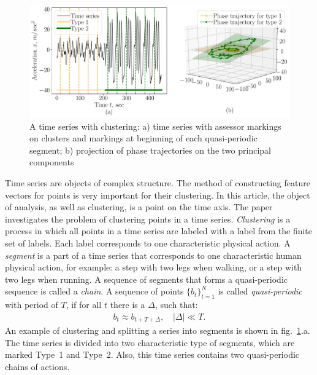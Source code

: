 \documentclass[12pt, twoside]{article}
\numberwithin{equation}{section}
\begin{document}
\begin{figure}[h!t]\center
\includegraphics[width=1\textwidth]{results_eng/introduction}
\caption{A time series with clustering:  a) time series with assessor markings on clusters and markings at beginning of each quasi-periodic segment; b) projection of phase trajectories on the two principal components}
\label{fig:introduction:1}
\end{figure}

Time series are objects of complex structure. 
The method of constructing feature vectors for points is very important for their clustering.
In this article, the object of analysis, as well as clustering, is a point on the time axis.
The paper investigates the problem of clustering points in a time series.
\textit{Clustering} is a process in which all points in a time series are labeled with a label from the finite set of labels.
Each label corresponds to one characteristic physical action.
A \textit{segment} is a part of a time series that corresponds to one characteristic human physical action, for example: a step with two legs when walking, or a step with two legs when running.
A sequence of segments that forms a quasi-periodic sequence is called a \textit{chain}.
A sequence of points $\{b_t\}_{t=1}^{N}$ is called \textit{quasi-periodic} with period of $T$, if for all $t$ there is a $\Delta$, such that:
\begin{equation}
\label{eq:int:1}
\begin{aligned}
b_t \approx b_{t+T+\Delta}, \quad \left|\Delta\right| \ll T.
\end{aligned}
\end{equation}
An example of clustering and splitting a series into segments is shown in fig.~\ref{fig:introduction:1}.a. 
The time series is divided into two characteristic type of segments, which are marked Type~1 and Type~2. 
Also, this time series contains two quasi-periodic chains of actions.
\end{document}
